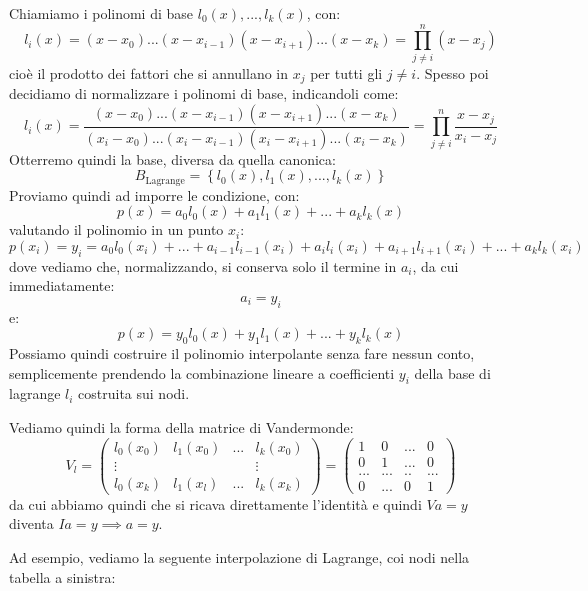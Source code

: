 \documentclass[a4paper,11pt]{article}
\begin{document}
Chiamiamo i polinomi di base $l_0(x), ..., l_k(x)$, con:
$$
l_i(x) = (x - x_0) ... (x - x_{i - 1}) (x - x_{i + 1}) ... (x - x_k) = \prod_{j \neq i}^n (x - x_j)
$$
cioè il prodotto dei fattori che si annullano in $x_j$ per tutti gli $j \neq i$.
Spesso poi decidiamo di normalizzare i polinomi di base, indicandoli come:
$$
l_i(x) = \frac{(x - x_0) ... (x - x_{i - 1}) (x - x_{i + 1}) ... (x - x_k)}{(x_i - x_0) ... (x_i - x_{i - 1}) (x_i - x_{i + 1}) ... (x_i - x_k)} = \prod_{j \neq i}^n \frac{x - x_j}{x_i - x_j} 
$$
Otterremo quindi la base, diversa da quella canonica:
$$
B_\text{Lagrange} = \left\{ l_0(x), l_1(x), ..., l_k(x) \right\}
$$
Proviamo quindi ad imporre le condizione, con:
$$
p(x) = a_0 l_0(x) + a_1 l_1(x) + ... + a_k l_k(x)
$$
valutando il polinomio in un punto $x_i$:
$$
p(x_i) = y_i = a_0 l_0(x_i) + ... + a_{i - 1} l_{i - 1}(x_i) + a_i l_i(x_i) + a_{i + 1} l_{i + 1}(x_i) + ... + a_k l_k(x_i)
$$
dove vediamo che, normalizzando, si conserva solo il termine in $a_i$, da cui immediatamente:
$$
a_i = y_i
$$
e:
$$
p(x) = y_0 l_0(x) + y_1 l_1(x) + ... + y_k l_k(x)
$$
Possiamo quindi costruire il polinomio interpolante senza fare nessun conto, semplicemente prendendo la combinazione lineare a coefficienti $y_i$ della base di lagrange $l_i$ costruita sui nodi.

Vediamo quindi la forma della matrice di Vandermonde:
$$
V_l =
\begin{pmatrix}
	l_0(x_0) & l_1(x_0) & ... & l_k(x_0) \\ 
	\vdots & & & \vdots \\
	l_0(x_k) & l_1(x_l) & ... & l_k(x_k)
\end{pmatrix} = 
\begin{pmatrix}
	1 & 0 & ... & 0 \\
	0 & 1 & ... & 0 \\
	... & ... & .. & ... \\
	0 & ... & 0 & 1
\end{pmatrix}
$$
da cui abbiamo quindi che si ricava direttamente l'identità e quindi $Va = y$ diventa $I a = y \implies a = y$.

Ad esempio, vediamo la seguente interpolazione di Lagrange, coi nodi nella tabella a sinistra:
\end{document}
